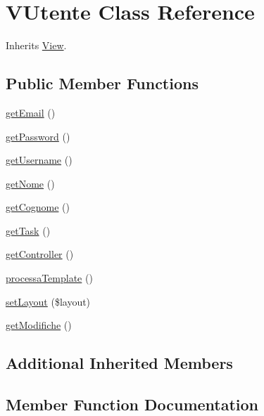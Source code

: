 \hypertarget{class_v_utente}{}\section{V\+Utente Class Reference}
\label{class_v_utente}


Inherits \mbox{\hyperlink{class_view}{View}}.

\subsection*{Public Member Functions}
\begin{DoxyCompactItemize}
\item 
\mbox{\hyperlink{class_v_utente_a8e8e53d000b24756a28571714930f40b}{get\+Email}} ()
\item 
\mbox{\hyperlink{class_v_utente_a34488b491367055c085d4f0fd5098c46}{get\+Password}} ()
\item 
\mbox{\hyperlink{class_v_utente_a115864c6bb5d14f4a2d217393e181cd9}{get\+Username}} ()
\item 
\mbox{\hyperlink{class_v_utente_aee96c810144e5af6ce3679f7968dba7f}{get\+Nome}} ()
\item 
\mbox{\hyperlink{class_v_utente_a761813210ec7a6d4fc8255f47dc2c6fd}{get\+Cognome}} ()
\item 
\mbox{\hyperlink{class_v_utente_a14be18c29e1d3bed4ac995207515fb8f}{get\+Task}} ()
\item 
\mbox{\hyperlink{class_v_utente_a7c31b84c15e80c9150c15d60c1807a20}{get\+Controller}} ()
\item 
\mbox{\hyperlink{class_v_utente_a76ea328ab7d219856682ff832b9419e0}{processa\+Template}} ()
\item 
\mbox{\hyperlink{class_v_utente_ae30bdda632dfa1f36c4da8bc801bdba1}{set\+Layout}} (\$layout)
\item 
\mbox{\hyperlink{class_v_utente_acff12f16c55ce487294d48e63616ca58}{get\+Modifiche}} ()
\end{DoxyCompactItemize}
\subsection*{Additional Inherited Members}


\subsection{Member Function Documentation}
\mbox{\label{class_v_utente_a761813210ec7a6d4fc8255f47dc2c6fd}} 
